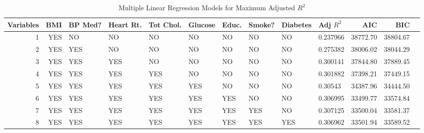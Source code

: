 \documentclass{article}\usepackage[]{graphicx}\usepackage[]{color}
\begin{document}
 



\begin{table}[ht]
\begin{tiny}
\centering
\begin{tabular}{rrllllllllrrr}
  \hline
Variables & BMI & BP Med? & Heart Rt. & Tot Chol. & Glucose & Educ. & Smoke? & Diabetes & Adj $R^2$ & AIC & BIC \\ 
  \hline
        1 & YES & NO & NO & NO & NO & NO & NO & NO & 0.237966 & 38772.70 & 38804.67 \\ 
     2 & YES & YES & NO & NO & NO & NO & NO & NO & 0.275382 & 38006.02 & 38044.29 \\ 
     3 & YES & YES & YES & NO & NO & NO & NO & NO & 0.300141 & 37844.80 & 37889.45 \\ 
     4 & YES & YES & YES & YES & NO & NO & NO & NO & 0.301882 & 37398.21 & 37449.15 \\ 
     5 & YES & YES & YES & YES & YES & NO & NO & NO & 0.30543 & 34387.96 & 34444.50 \\ 
     6 & YES & YES & YES & YES & YES & YES & NO & NO & 0.306995 & 33499.77 & 33574.84 \\ 
     7 & YES & YES & YES & YES & YES & YES & YES & NO & 0.307125 & 33500.04 & 33581.37 \\ 
     8 & YES & YES & YES & YES & YES & YES & YES & YES & 0.306962 & 33501.94 & 33589.52 \\  
   \hline
   \end{tabular}
\caption{Multiple Linear Regression Models for Maximum Adjusted $R^2$}
\end{tiny}
\end{table}
\end{document}
